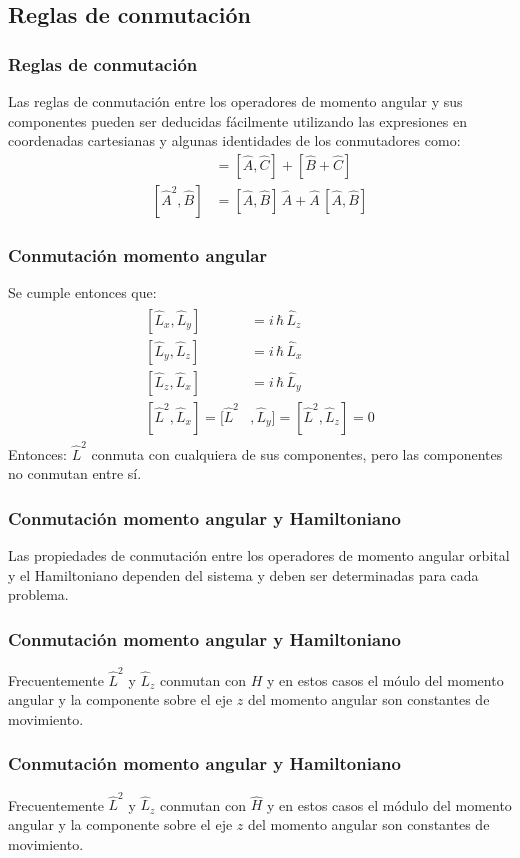 \subsection{Reglas de conmutación}
\begin{frame}
\frametitle{Reglas de conmutación}
Las reglas de conmutación entre los operadores de momento angular y sus componentes pueden ser deducidas fácilmente utilizando las expresiones en coordenadas cartesianas y algunas identidades de los conmutadores como:
\begin{align*}
[ \hat{A} + \hat{B}, \hat{C}] &= [\hat{A}, \hat{C}] + [\hat{B} + \hat{C}] \\[0.5em]
[ \hat{A}^{2} , \hat{B}] &= [\hat{A}, \hat{B}] \, \hat{A} +  \hat{A} \, [\hat{A} , \hat{B}]
\end{align*}
\end{frame}
\begin{frame}
\frametitle{Conmutación momento angular}
Se cumple entonces que:
\begin{align}
\begin{aligned}
[ \hat{L}_{x}, \hat{L}_{y} ] &= i \, \hbar \, \hat{L}_{z} \\[0.5em]
[ \hat{L}_{y}, \hat{L}_{z} ] &= i \, \hbar \, \hat{L}_{x} \\[0.5em]
[ \hat{L}_{z}, \hat{L}_{x} ] &= i \, \hbar \, \hat{L}_{y} \\[0.5em]
[\hat{L}^{2}, \hat{L}_{x}] = [\hat{L}^{2}&, \hat{L}_{y}] = [\hat{L}^{2}, \hat{L}_{z}] = 0
\end{aligned}
\label{eq:ecuacion_01_07}
\end{align}
\fontsize{12}{12}\selectfont
Entonces: $\hat{L}^{2}$ conmuta con cualquiera de sus componentes, pero las componentes no conmutan entre sí.
\end{frame}
\begin{frame}
\frametitle{Conmutación momento angular y Hamiltoniano}
Las propiedades de conmutación entre los operadores de momento angular orbital y el Hamiltoniano dependen del sistema y deben ser determinadas para cada problema.
\end{frame}
\begin{frame}
\frametitle{Conmutación momento angular y Hamiltoniano}
Frecuentemente $\hat{L}^{2}$ y $\hat{L}_{z}$ conmutan con $H$ y en estos casos el móulo del momento angular y la componente sobre el eje $z$ del momento angular son constantes de movimiento. 
\end{frame}
\begin{frame}
\frametitle{Conmutación momento angular y Hamiltoniano}
Frecuentemente $\hat{L}^{2}$ y $\hat{L}_{z}$ conmutan con $\hat{H}$ y en estos casos el módulo del momento angular y la componente sobre el eje $z$ del momento angular son constantes de movimiento.
\end{frame}
